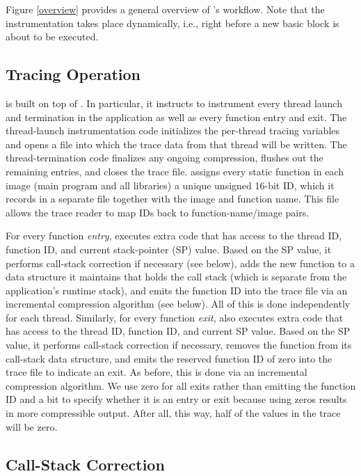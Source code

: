 Figure \ref{overview} provides a general overview of \parlot 's workflow. Note that the instrumentation takes place dynamically, i.e., right before a new basic block is about to be executed.


\subsection{Tracing Operation}

\parlot is built on top of \pin. In particular, it instructs \pin to instrument every thread launch and termination in the application as well as every function entry and exit. The thread-launch instrumentation code initializes the per-thread tracing variables and opens a file into which the trace data from that thread will be written. The thread-termination code finalizes any ongoing compression, flushes out the remaining entries, and closes the trace file. \parlot assigns every static function in each image (main program and all libraries) a unique unsigned 16-bit ID, which it records in a separate file together with the image and function name. This file allows the trace reader to map IDs back to function-name/image pairs.

For every function \emph{entry}, \parlot executes extra code that has access to the thread ID, function ID, and current stack-pointer (SP) value. Based on the SP value, it performs call-stack correction if necessary (see below), adds the new function to a data structure it maintains that holds the call stack (which is separate from the application's runtime stack), and emits the function ID into the trace file via an incremental compression algorithm (see below). All of this is done independently for each thread. Similarly, for every function \emph{exit}, \parlot also executes extra code that has access to the thread ID, function ID, and current SP value. Based on the SP value, it performs call-stack correction if necessary, removes the function from its call-stack data structure, and emits the reserved function ID of zero into the trace file to indicate an exit. As before, this is done via an incremental compression algorithm. We use zero for all exits rather than emitting the function ID and a bit to specify whether it is an entry or exit because using zeros results in more compressible output. After all, this way, half of the values in the trace will be zero.


\subsection{Call-Stack Correction}

